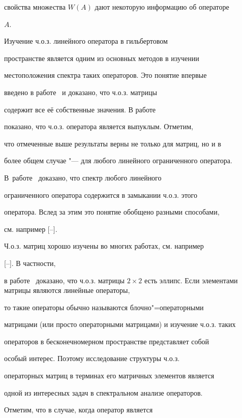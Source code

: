 свойства множества $W(A)$ дают некоторую информацию об операторе

$A$.



Изучение ч.о.з. линейного оператора в гильбертовом

пространстве является одним из основных методов в изучении

местоположения спектра таких операторов. Это понятие впервые

введено в работе~\cite{RD:bib:OT} и доказано, что ч.о.з. матрицы

содержит все её собственные значения. В работе~\cite{RD:bib:FH}

показано, что ч.о.з. оператора является выпуклым. Отметим,

что отмеченные выше результаты верны не только для матриц, но и в

более общем  случае "--- для любого линейного ограниченного оператора. 

В~работе~\cite{RD:bib:AW} доказано, что спектр любого линейного

ограниченного оператора содержится в замыкании ч.о.з. этого

оператора. Вслед за этим это понятие обобщено разными способами,

см. например [--].



Ч.о.з. матриц хорошо изучены во многих работах, см. например

[--]. В частности,

в работе~\cite{RD:bib:GR} доказано, что ч.о.з. матрицы $2 \times

2$ есть эллипс. Если элементами матрицы являются линейные операторы,

то такие операторы обычно называются блочно"=операторными

матрицами (или просто операторными матрицами) и изучение ч.о.з. таких

операторов в бесконечномерном пространстве представляет собой

особый интерес. Поэтому исследование структуры ч.о.з.

операторных матриц в терминах его матричных элементов является

одной из интересных задач в спектральном анализе операторов.



Отметим, что в случае, когда оператор является

